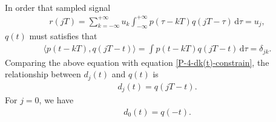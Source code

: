 \documentclass{assignment}
\begin{document}
\begin{sol}
\begin{itemize}
\begin{align}
        \end{align}
        In order that sampled signal
        \begin{align}
            r(jT)=\sum_{k=-\infty}^{+\infty}u_k\int_{-\infty}^{+\infty}p(\tau-kT)q(jT-\tau)\,\mathrm{d}\tau=u_j,
        \end{align}
        $q(t)$ must satisfies that
        \begin{align}
            \langle p(t-kT),q(jT-t)\rangle=\int p(t-kT)q(jT-t)\,\mathrm{d}\tau=\delta_{jk}.
        \end{align}
        Comparing the above equation with equation \eqref{P-4-dk(t)-constrain}, the relationship between $d_j(t)$ and $q(t)$ is
        \begin{align}
            d_j(t)=q(jT-t).
        \end{align}
        For $j=0$, we have
        \begin{align}
            d_0(t)=q(-t).
        \end{align}
    \end{itemize}
\end{sol}
\end{document}
